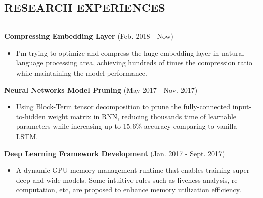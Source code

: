 \documentclass{res}
\begin{document}
\begin{resume}
\section{RESEARCH EXPERIENCES}
\vspace{-1ex}
\noindent\rule[0.1\baselineskip]{\textwidth}{1pt}
\textbf{Compressing Embedding Layer} (Feb. 2018 - Now)
\begin{itemize}\setlength{\itemsep}{-0.5ex}
    \item I'm trying to optimize and compress the huge embedding layer in natural language processing area, achieving hundreds of times the compression ratio while maintaining the model performance.
\end{itemize}

\vspace{-2ex}
\textbf{Neural Networks Model Pruning} (May 2017 - Nov. 2017)
\begin{itemize}\setlength{\itemsep}{-0.5ex}
    \item Using Block-Term tensor decomposition to prune the fully-connected input-to-hidden weight matrix in RNN, reducing thousands time of learnable parameters while increasing up to 15.6\% accuracy comparing to vanilla LSTM.
\end{itemize}

\vspace{-2ex}
\textbf{Deep Learning Framework Development} (Jan. 2017 - Sept. 2017)
\begin{itemize}\setlength{\itemsep}{-0.5ex}
\item A dynamic GPU memory management runtime that enables training super deep and wide models. Some intuitive rules such as liveness analysis, re-computation, etc, are proposed to enhance memory utilization efficiency.
\end{itemize}



\end{resume}
\end{document}
